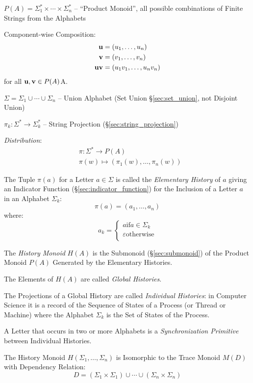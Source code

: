 $P(A) = \Sigma_1^* \times \cdots \times \Sigma_n^*$ -- ``Product
Monoid'', all possible combinations of Finite Strings from the
Alphabets %

Component-wise Composition:
\begin{align*}
  \mathbf{u} &= (u_1, \ldots, u_n) \\
  \mathbf{v} &= (v_1, \ldots, v_n) \\
  \mathbf{uv} &= (u_1 v_1, \ldots, u_n v_n)
\end{align*}
for all $\mathbf{u},\mathbf{v} \in P(A)$A.

$\Sigma = \Sigma_1 \cup \cdots \cup \Sigma_n$ -- Union Alphabet (Set
Union \S\ref{sec:set_union}, not Disjoint Union)

$\pi_k : \Sigma^* \rightarrow \Sigma_k^*$ -- String Projection
(\S\ref{sec:string_projection})

\emph{Distribution}:
\begin{align*}
  & \pi : \Sigma^* \rightarrow P(A) \\
  & \pi(w) \mapsto (\pi_1(w), \ldots, \pi_n(w))
\end{align*}

The Tuple $\pi(a)$ for a Letter $a \in \Sigma$ is called the
\emph{Elementary History} of $a$ giving an Indicator Function
(\S\ref{sec:indicator_function}) for the Inclusion of a Letter $a$ in
an Alphabet $\Sigma_k$:
\[
  \pi(a) = (a_1, \ldots, a_n)
\]
where:
\[
  a_k =
  \begin{cases}
    a \text{if} a \in \Sigma_k \\
    \varepsilon \text{otherwise} \\
  \end{cases}
\]

The \emph{History Monoid} $H(A)$ is the Submonoid
(\S\ref{sec:submonoid}) of the Product Monoid $P(A)$ Generated by the
Elementary Histories.

The Elements of $H(A)$ are called \emph{Global Histories}.

The Projections of a Global History are called \emph{Individual
  Histories}: in Computer Science it is a record of the Sequence of
States of a Process (or Thread or Machine) where the Alphabet
$\Sigma_k$ is the Set of States of the Process.

A Letter that occurs in two or more Alphabets is a
\emph{Synchronization Primitive} between Individual Histories.

The History Monoid $H(\Sigma_1, \ldots, \Sigma_n)$ is Isomorphic to
the Trace Monoid $M(D)$ with Dependency Relation:
\[
  D = (\Sigma_1 \times \Sigma_1) \cup \cdots
    \cup (\Sigma_n \times \Sigma_n)
\]



